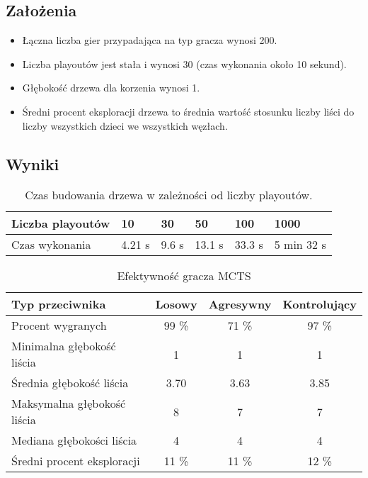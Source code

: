 \documentclass[10pt,a4paper]{article}
\begin{document}
\subsection*{Założenia}
\begin{itemize}
	\item Łączna liczba gier przypadająca na typ gracza wynosi 200.
	\item Liczba playoutów jest stała i wynosi 30 (czas wykonania około 10 sekund).
	\item Głębokość drzewa dla korzenia wynosi 1.
	\item Średni procent eksploracji drzewa to średnia wartość stosunku liczby liści do liczby wszystkich dzieci we wszystkich węzłach.
\end{itemize}
\subsection*{Wyniki}
\begin{table}[h]
\centering
\caption{Czas budowania drzewa w zależności od liczby playoutów.}
\begin{tabular}{|l|l|l|l|l|l|}
\hline
Liczba playoutów & 10     & 30    & 50     & 100    & 1000       \\ \hline
Czas wykonania   & 4.21 s & 9.6 s & 13.1 s & 33.3 s & 5 min 32 s \\ \hline
\end{tabular}
\end{table}

\begin{table}[h]
\centering
\caption{Efektywność gracza MCTS}
\begin{tabular}{|l|c|c|c|}
\hline
Typ przeciwnika             & Losowy & Agresywny & Kontrolujący \\ \hline
Procent wygranych           & 99 \%  & 71 \%     & 97 \%        \\ \hline
Minimalna głębokość liścia  & 1      & 1         & 1            \\ \hline
Średnia głębokość liścia    & 3.70   & 3.63      & 3.85         \\ \hline
Maksymalna głębokość liścia & 8      & 7         & 7            \\ \hline
Mediana głębokości liścia   & 4      & 4         & 4            \\ \hline
Średni procent eksploracji  & 11 \%  & 11 \%     & 12 \%        \\ \hline
\end{tabular}
\end{table}
\end{document}
